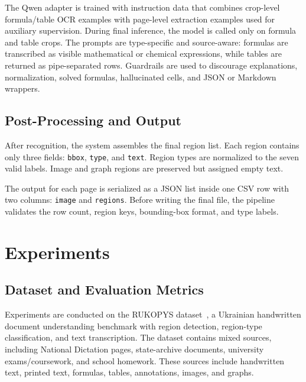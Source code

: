 \documentclass[runningheads]{llncs}
\begin{document}
The Qwen adapter is trained with instruction data that combines crop-level formula/table OCR examples with page-level extraction examples used for auxiliary supervision. During final inference, the model is called only on formula and table crops. The prompts are type-specific and source-aware: formulas are transcribed as visible mathematical or chemical expressions, while tables are returned as pipe-separated rows. Guardrails are used to discourage explanations, normalization, solved formulas, hallucinated cells, and JSON or Markdown wrappers.

\subsection{Post-Processing and Output}
\label{sec:postprocessing}

After recognition, the system assembles the final region list. Each region contains only three fields: \texttt{bbox}, \texttt{type}, and \texttt{text}. Region types are normalized to the seven valid labels. Image and graph regions are preserved but assigned empty text.

The output for each page is serialized as a JSON list inside one CSV row with two columns: \texttt{image} and \texttt{regions}. Before writing the final file, the pipeline validates the row count, region keys, bounding-box format, and type labels.

\section{Experiments}
\label{sec:experiments}

\subsection{Dataset and Evaluation Metrics}
\label{sec:dataset}

Experiments are conducted on the RUKOPYS dataset~\cite{rukopys_2026}, a Ukrainian handwritten document understanding benchmark with region detection, region-type classification, and text transcription. The dataset contains mixed sources, including National Dictation pages, state-archive documents, university exams/coursework, and school homework. These sources include handwritten text, printed text, formulas, tables, annotations, images, and graphs.
\end{document}
